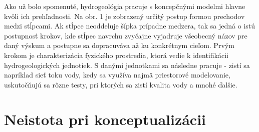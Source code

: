 \documentclass[10pt,twoside,slovak, a4paper]{article}
\begin{document}
Ako už bolo spomenuté, hydrogeológia pracuje s koncepčnými modelmi hlavne kvôli ich prehľadnosti. Na obr. 1 je zobrazený určitý postup formou prechodov medzi stĺpcami. Ak stĺpce neoddeluje šípka prípadne medzera, tak sa jedná o istú postupnosť krokov, kde stĺpec navrchu zvyčajne vyjadruje všeobecný názov pre daný výskum a postupne sa dopracuváva až ku konkrétnym cieľom. Prvým krokom je charakterizácia fyzického prostredia, ktorá vedie k identifikácii hydrogeologických jednotiek. S danými jednotkami sa následne pracuje - zistí sa napríklad sieť toku vody, kedy sa využíva najmä priestorové modelovanie, uskutočňujú sa rôzne testy, pri ktorých sa zistí kvalita vody a mnohé ďalšie.\cite{Tobon:CMiH} 

\section{Neistota pri konceptualizácii} \label{neistota}
\end{document}

